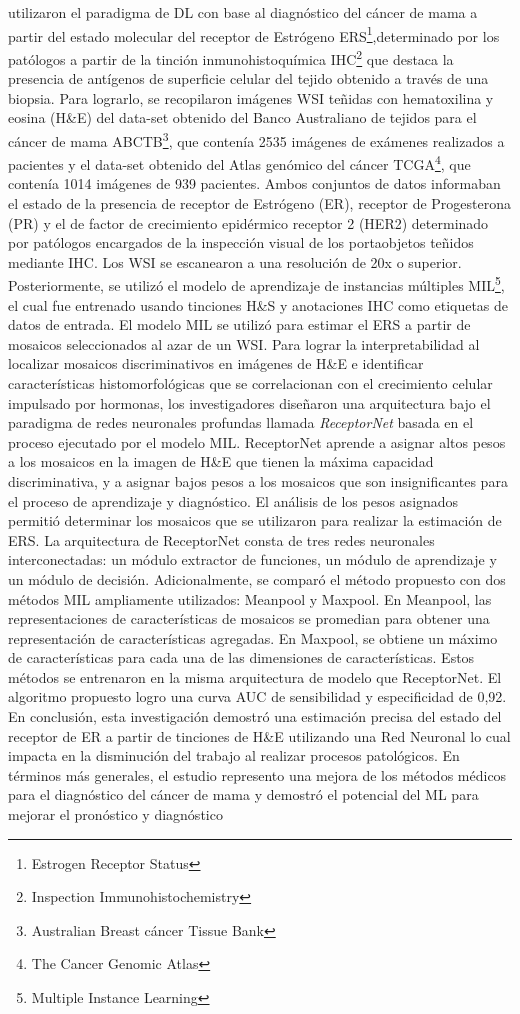 \cite{Naik2020} utilizaron el paradigma de DL con base al diagnóstico del cáncer de mama a partir del estado molecular del receptor de Estrógeno ERS\footnote{Estrogen Receptor Status},determinado por los patólogos a partir de la tinción inmunohistoquímica IHC\footnote{Inspection Immunohistochemistry} que destaca la presencia de antígenos de superficie celular del tejido obtenido a través de una biopsia. Para lograrlo, se recopilaron imágenes WSI teñidas con hematoxilina y eosina (H\&E) del data-set obtenido del Banco Australiano de tejidos para el cáncer de mama ABCTB\footnote{Australian Breast cáncer Tissue Bank}, que contenía 2535 imágenes de exámenes realizados a pacientes y el data-set obtenido del Atlas genómico del cáncer TCGA\footnote{The Cancer Genomic Atlas}, que contenía 1014 imágenes de 939 pacientes. Ambos conjuntos de datos informaban el estado de la presencia de receptor de Estrógeno (ER), receptor de Progesterona (PR) y el de factor de crecimiento epidérmico receptor 2 (HER2) determinado por patólogos encargados de la inspección visual de los portaobjetos teñidos mediante IHC. Los WSI se escanearon a una resolución de 20x o superior. Posteriormente, se utilizó el modelo de aprendizaje de instancias múltiples MIL\footnote{Multiple Instance Learning}, el cual fue entrenado usando tinciones H\&S y anotaciones IHC como etiquetas de datos de entrada. El modelo MIL se utilizó para estimar el ERS a partir de mosaicos seleccionados al azar de un WSI. Para lograr la interpretabilidad al localizar mosaicos discriminativos en imágenes de H\&E e identificar características histomorfológicas que se correlacionan con el crecimiento celular impulsado por hormonas, los investigadores diseñaron una arquitectura bajo el paradigma de redes neuronales profundas llamada \textit{ReceptorNet} basada en el proceso ejecutado por el modelo MIL. ReceptorNet aprende a asignar altos pesos a los mosaicos en la imagen de H\&E que tienen la máxima capacidad discriminativa, y a asignar bajos pesos a los mosaicos que son insignificantes para el proceso de aprendizaje y diagnóstico. El análisis de los pesos asignados permitió determinar los mosaicos que se utilizaron para realizar la estimación de ERS.  La arquitectura de ReceptorNet consta de tres redes neuronales interconectadas: un módulo extractor de funciones, un módulo de aprendizaje y un módulo de decisión. Adicionalmente, se comparó el método propuesto con dos métodos MIL ampliamente utilizados: Meanpool y Maxpool. En Meanpool, las representaciones de características de mosaicos se promedian para obtener una representación de características agregadas. En Maxpool, se obtiene un máximo de características para cada una de las dimensiones de características. Estos métodos se entrenaron en la misma arquitectura de modelo que ReceptorNet. El algoritmo propuesto logro una curva AUC de sensibilidad y especificidad de 0,92. En conclusión, esta investigación demostró una estimación precisa del estado del receptor de ER a partir de tinciones de H\&E utilizando una Red Neuronal lo cual impacta en la disminución del trabajo al realizar procesos patológicos. En términos más generales, el estudio represento una mejora de los métodos médicos para el diagnóstico del cáncer de mama y demostró el potencial del ML para mejorar el pronóstico y diagnóstico 